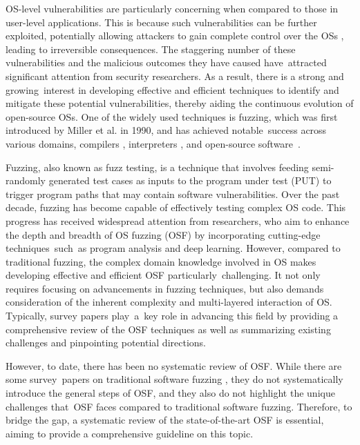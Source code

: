 OS-level vulnerabilities are particularly concerning when compared to those in user-level applications. This is because such vulnerabilities can be further exploited, potentially allowing attackers to gain complete control over the OSs \cite{kernel-exploits, Xu2015FromCT, Zhang2015AndroidRA,chen2019slake}, leading to irreversible consequences. The staggering number of these vulnerabilities and the malicious outcomes they have caused have~attracted significant attention from security researchers. As a result, there is a strong and growing~interest in developing effective and efficient techniques to identify and mitigate these potential vulnerabilities, thereby aiding the continuous evolution of open-source OSs. One of the widely used techniques is fuzzing, which was first introduced by Miller et al. \cite{Miller1990AnES} in 1990, and has achieved notable~success across various domains, \eg compilers \cite{Yang2023WhiteboxCF}, interpreters \cite{Holler2012FuzzingWC}, and open-source software~\cite{Serebryany2017OSSFuzzG}.

Fuzzing, also known as fuzz testing, is a technique that involves feeding semi-randomly generated test cases as inputs to the program under test (PUT) to trigger program paths that may contain software vulnerabilities. Over the past decade, fuzzing has become capable of effectively testing complex OS code. This progress has received widespread attention from researchers, who aim to enhance the depth and breadth of OS fuzzing ({OSF}) by incorporating cutting-edge techniques~such~as program analysis and deep learning. However, compared to traditional fuzzing, the complex domain knowledge involved in OS makes developing effective and efficient OSF particularly~challenging. It not only requires focusing on advancements in fuzzing techniques, but also demands consideration of the inherent complexity and multi-layered interaction of OS. Typically, survey papers play~a~key role in advancing this field by providing a comprehensive review of the OSF techniques as well as summarizing existing challenges and pinpointing potential directions.

However, to date, there has been no systematic review of OSF. While there are some survey~papers on traditional software fuzzing \cite{Eisele2022EmbeddedFA,Yun2022FuzzingOE,Zhu2022FuzzingAS,Mans2018TheAS,Li2018FuzzingAS,Liang2018FuzzingSO,Zhang2018SurveyOD,Mallissery2023DemystifyTF,bohme2020fuzzing,Godefroid2020}, they do not systematically introduce the general steps of OSF, and they also do not highlight the unique challenges that~OSF faces compared to traditional software fuzzing. Therefore, to bridge the gap, a systematic review of the state-of-the-art OSF is essential, aiming to provide a comprehensive guideline on this topic.

